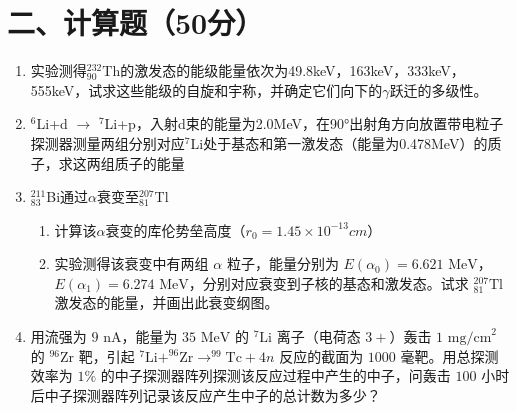 \documentclass{article}
\begin{document}
\section*{二、计算题（50分）}
\begin{enumerate}
  \item 实验测得$_{90}^{232}$Th的激发态的能级能量依次为49.8keV，163keV，333keV，555keV，试求这些能级的自旋和宇称，并确定它们向下的$\gamma$跃迁的多级性。
  

  \item $^6$Li+d $\rightarrow$  $^7$Li+p，入射d束的能量为2.0MeV，在90°出射角方向放置带电粒子探测器测量两组分别对应$^7$Li处于基态和第一激发态（能量为0.478MeV）的质子，求这两组质子的能量

  \item $_{83}^{211}$Bi通过$\alpha$衰变至$_{81}^{207}$Tl
  \begin{enumerate}
      \item 计算该$\alpha$衰变的库伦势垒高度（$r_0=1.45×10^{-13}cm$）
      \item 实验测得该衰变中有两组 \(\alpha\) 粒子，能量分别为 \(E(\alpha_0) = 6.621 \text{ MeV}\)，\(E(\alpha_1) = 6.274 \text{ MeV}\)，分别对应衰变到子核的基态和激发态。试求 \(_{81}^{207}\text{Tl}\) 激发态的能量，并画出此衰变纲图。
  \end{enumerate}

  \item 用流强为 \(9 \text{ nA}\)，能量为 \(35 \text{ MeV}\) 的 \(^7\text{Li}\) 离子（电荷态 \(3+\)）轰击 \(1 \text{ mg/cm}^2\) 的 \(^{96}\text{Zr}\) 靶，引起 \(^7\text{Li} + ^{96}\text{Zr} \rightarrow ^{99}\text{Tc} + 4n\) 反应的截面为 \(1000 \text{ 毫靶}\)。用总探测效率为 \(1\%\) 的中子探测器阵列探测该反应过程中产生的中子，问轰击 \(100\) 小时后中子探测器阵列记录该反应产生中子的总计数为多少？
\end{enumerate}
\end{document}
